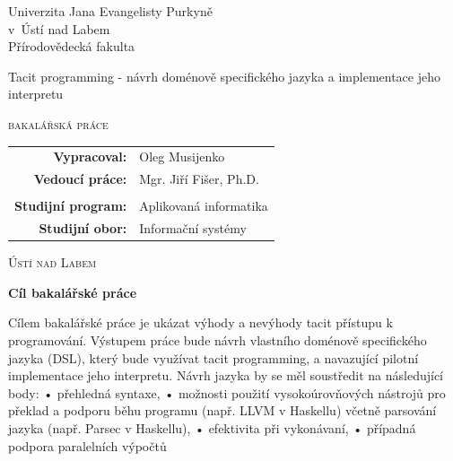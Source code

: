 \documentclass[male,czech]{kithesis}
\newcommand{\AUTOR}{Oleg Musijenko}
\newcommand{\TITULcz}{Tacit programming - návrh doménově specifického jazyka a implementace jeho interpretu} %
\newcommand{\VEDOUCI}{Mgr. Jiří Fišer, Ph.D.}
\newcommand{\PROGRAM}{Aplikovaná informatika}
\newcommand{\OBOR}{Informační systémy}
\begin{document}
\thispagestyle{empty}
\begin{center}
{\Huge Univerzita Jana Evangelisty Purkyně \\
v~Ústí nad Labem}
\\[16pt]
{\huge Přírodovědecká fakulta}

\vspace{2cm}

\vspace{2cm}
{
\huge
\TITULcz\par

\vspace{0.5em}
\LARGE\scshape bakalářská práce
}
\end{center} 
 
\vfill
{
\large
\begin{tabular}{>{\bfseries}rl}
    Vypracoval: 	& \AUTOR\\
    Vedoucí práce: 	& \VEDOUCI\\
&\\
Studijní program:       & \PROGRAM\\
Studijní obor:          & \OBOR\\
\end{tabular} 
}
\vspace{1.5cm}
\begin{center}
\Large\scshape   Ústí nad Labem \the\year
\end{center}

\cleardoublepage
\thispagestyle{empty}

\textbf{\textsf{Cíl bakalářské práce}}

Cílem bakalářské práce je ukázat výhody a nevýhody tacit přístupu k programování. Výstupem práce bude návrh vlastního doménově specifického jazyka (DSL), který
bude využívat tacit programming, a navazující pilotní implementace jeho interpretu.
Návrh jazyka by se měl soustředit na následující body:
• přehledná syntaxe,
• možnosti použití vysokoúrovňových nástrojů pro překlad a podporu běhu programu (např. LLVM v Haskellu) včetně parsování jazyka (např. Parsec v Haskellu),
• efektivita při vykonávaní,
• případná podpora paralelních výpočtů
\end{document}

